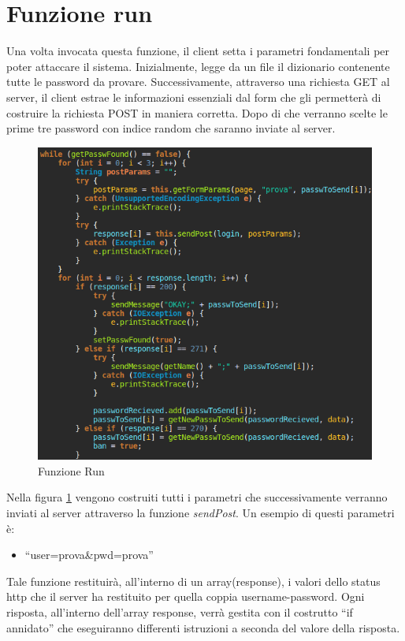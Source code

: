 \documentclass[a4paper,12pt,titlepage,oneside,openany]{book}
\begin{document}
\section{Funzione run}
Una volta invocata questa funzione, il client setta i parametri fondamentali per poter attaccare il sistema. Inizialmente, legge da un file il dizionario contenente tutte le password da provare. Successivamente, attraverso una richiesta GET al server, il client estrae le informazioni essenziali dal form che gli permetterà di costruire la richiesta POST in maniera corretta. Dopo di che verranno scelte le prime tre password con indice random che saranno inviate al server.
\begin{figure}[H]
	\centering
	\includegraphics[scale=0.6]{run1.png}
	\caption{Funzione Run}
	\label{fig:run1}
\end{figure}
\noindent
Nella figura \ref{fig:run1} vengono costruiti tutti i parametri che successivamente verranno inviati al server attraverso la funzione \textit{sendPost}. Un esempio di questi parametri è:
\begin{itemize}
	\centering \item []“user=prova\&pwd=prova”
\end{itemize}
\noindent
Tale funzione restituirà, all'interno di un array(response), i valori dello status http che il server ha restituito per quella coppia username-password. Ogni risposta, all'interno dell'array response, verrà gestita con il costrutto “if annidato” che eseguiranno differenti istruzioni a seconda del valore della risposta.
\end{document}
